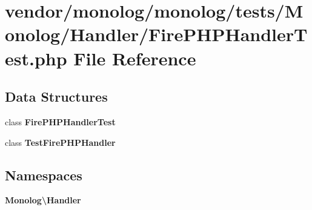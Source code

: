 \section{vendor/monolog/monolog/tests/\+Monolog/\+Handler/\+Fire\+P\+H\+P\+Handler\+Test.php File Reference}
\label{_fire_p_h_p_handler_test_8php}
\subsection*{Data Structures}
\begin{DoxyCompactItemize}
\item 
class {\bf Fire\+P\+H\+P\+Handler\+Test}
\item 
class {\bf Test\+Fire\+P\+H\+P\+Handler}
\end{DoxyCompactItemize}
\subsection*{Namespaces}
\begin{DoxyCompactItemize}
\item 
 {\bf Monolog\textbackslash{}\+Handler}
\end{DoxyCompactItemize}
